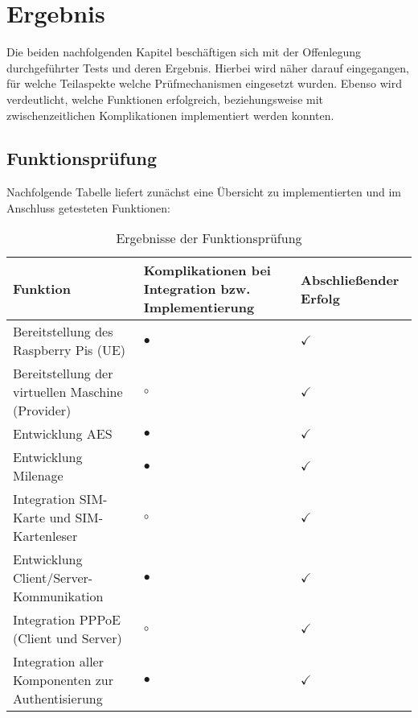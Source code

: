 \section[Ergebnis (Schenkel)]{Ergebnis}
	Die beiden nachfolgenden Kapitel beschäftigen sich mit der Offenlegung durchgeführter Tests und deren Ergebnis.
	Hierbei wird näher darauf eingegangen, für welche Teilaspekte welche Prüfmechanismen
	eingesetzt wurden. Ebenso wird verdeutlicht, welche Funktionen erfolgreich, beziehungsweise
	mit zwischenzeitlichen Komplikationen implementiert werden konnten.

	\subsection[Funktionsprüfung (Schenkel)]{Funktionsprüfung}
	\label{ergebnis-tests}
	Nachfolgende Tabelle liefert zunächst eine Übersicht zu implementierten und im Anschluss
	getesteten Funktionen:\vspace*{5mm}

	\begin{table}[h]
	\begin{tabularx}{\textwidth}{|X||X|X|}
    \hline
      \textbf{Funktion} & \textbf{Komplikationen bei Integration bzw. Implementierung} & \textbf{Abschließender Erfolg} \\
    \hline
    \hline
     	Bereitstellung des Raspberry Pis (UE) & $\bullet$ & $\checkmark$ \\
    \hline
    \hline
     	Bereitstellung der virtuellen Maschine (Provider) & $\circ$ & $\checkmark$ \\
    \hline
    \hline
     	Entwicklung AES & $\bullet$ & $\checkmark$ \\
    \hline
    \hline
    	Entwicklung Milenage & $\bullet$ & $\checkmark$ \\
    \hline
    \hline
    	Integration SIM-Karte und SIM-Kartenleser & $\circ$ & $\checkmark$ \\
    \hline
    \hline
    	Entwicklung Client/Server-Kommunikation & $\bullet$ & $\checkmark$ \\
    \hline
    \hline
    	Integration PPPoE (Client und Server) & $\circ$ & $\checkmark$ \\
    \hline
    \hline
    	Integration aller Komponenten zur Authentisierung & $\bullet$ & $\checkmark$ \\
    \hline
    \end{tabularx}
    \caption{Ergebnisse der Funktionsprüfung}
    \end{table}

